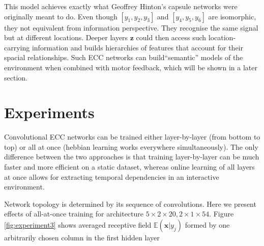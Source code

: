 \documentclass[12pt]{article}
\begin{document}
This model achieves exactly what Geoffrey Hinton's capsule networks were originally meant to do. Even though $[y_1,y_2,y_3]$ and   $[y_4,y_5,y_6]$ are isomorphic, they not equivalent from information perspective. They recognise the same signal but at different locations. Deeper layers $\boldsymbol{z}$ could then access such location-carrying information and builds hierarchies of features that account for their spacial relationships. Such ECC networks can build``semantic'' models of the environment when combined with motor feedback, which will be shown in a later section.


\section{Experiments}

Convolutional ECC networks can be trained either layer-by-layer (from bottom to top) or all at once (hebbian learning works everywhere simultaneously). The only difference between the two approaches is that training layer-by-layer can be much faster and more efficient on a static dataset, whereas online learning of all layers at once allows for extracting temporal dependencies in an interactive environment. 

Network topology is determined by its sequence of convolutions. Here we present effects of all-at-once training for architecture $5\times 2 \times 20,  2\times 1 \times 54$. Figure  \ref{fig:experiment3} shows averaged receptive field $\mathbb{E}(\boldsymbol{x}|y_j)$ formed by one arbitrarily chosen column in the first hidden layer
\end{document}
